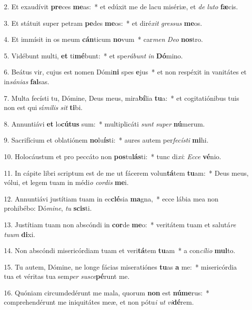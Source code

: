 2. Et exaudívit \textbf{pre}ces \textbf{me}as:~*  et edúxit me de lacu misériæ, et \textit{de} \textit{lu}\textit{to} \textbf{fæ}cis.\

3. Et státuit super petram \textbf{pe}des \textbf{me}os:~*  et diré\textit{xit} \textit{gres}\textit{sus} \textbf{me}os.\

4. Et immísit in os meum \textbf{cán}ticum \textbf{no}vum~*  car\textit{men} \textit{De}\textit{o} \textbf{nos}tro.\

5. Vidébunt multi, \textbf{et} ti\textbf{mé}bunt:~*  et spe\textit{rá}\textit{bunt} \textit{in} \textbf{Dó}mino.\

6. Beátus vir, cujus est nomen Dómi\textbf{ni} spes \textbf{e}jus~*  et non respéxit in vanitátes et in\textit{sá}\textit{ni}\textit{as} \textbf{fal}sas.\

7. Multa fecísti tu, Dómine, Deus meus, mira\textbf{bí}lia \textbf{tu}a:~*  et cogitatiónibus tuis non est qui sí\textit{mi}\textit{lis} \textit{sit} \textbf{ti}bi.\

8. Annuntiávi \textbf{et} lo\textbf{cú}\textbf{tus} sum:~*  multiplicáti \textit{sunt} \textit{su}\textit{per} \textbf{nú}merum.\

9. Sacrifícium et oblatiónem \textbf{no}lu\textbf{ís}ti:~*  aures autem per\textit{fe}\textit{cís}\textit{ti} \textbf{mi}hi.\

10. Holocáustum et pro peccáto non \textbf{pos}tu\textbf{lás}ti:~*  tunc di\textit{xi}: \textit{Ec}\textit{ce} \textbf{vé}nio.\

11. In cápite libri scriptum est de me ut fácerem volun\textbf{tá}tem \textbf{tu}am:~*  Deus meus, vólui, et legem tuam in médi\textit{o} \textit{cor}\textit{dis} \textbf{me}i.\

12. Annuntiávi justítiam tuam in ec\textbf{clé}sia \textbf{ma}gna,~*  ecce lábia mea non prohibébo: Dó\textit{mi}\textit{ne}, \textit{tu} \textbf{scis}ti.\

13. Justítiam tuam non abscóndi in \textbf{cor}de \textbf{me}o:~*  veritátem tuam et salutá\textit{re} \textit{tu}\textit{um} \textbf{di}xi.\

14. Non abscóndi misericórdiam tuam et veri\textbf{tá}tem \textbf{tu}am~*  a con\textit{cí}\textit{li}\textit{o} \textbf{mul}to.\

15. Tu autem, Dómine, ne longe fácias miseratiónes \textbf{tu}as \textbf{a} me:~*  misericórdia tua et véritas tua sem\textit{per} \textit{su}\textit{sce}\textbf{pé}runt me.\

16. Quóniam circumdedérunt me mala, quorum \textbf{non} est \textbf{nú}\textbf{me}rus:~*  comprehendérunt me iniquitátes meæ, et non pótu\textit{i} \textit{ut} \textit{vi}\textbf{dé}rem.\

